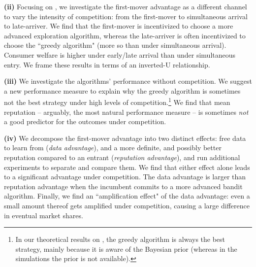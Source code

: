 
\textbf{(ii)} Focusing on \HardMax, we investigate the first-mover advantage as a different channel to vary the intensity of competition: from the first-mover to simultaneous arrival to late-arriver. We find that the first-mover is incentivized to choose a more advanced exploration algorithm, whereas the late-arriver is often incentivized to choose the ``greedy algorithm" (more so than under simultaneous arrival). Consumer welfare is higher under early/late arrival than under simultaneous entry. We frame these results in terms of an inverted-U relationship.



\textbf{(iii)} We investigate the algorithms' performance without competition. We suggest a new performance measure to explain why the greedy algorithm is sometimes not the best strategy under high levels of competition.\footnote{In our theoretical results on \HardMax, the greedy algorithm is always the best strategy, mainly because it is aware of the Bayesian prior (whereas in the simulations  the prior is not available).}
     We find that mean reputation -- arguably, the most natural performance measure -- is sometimes \emph{not} a good predictor for the outcomes under competition.

\textbf{(iv)} We decompose the first-mover advantage into two distinct effects: free data to learn from (\emph{data advantage}), and a more definite, and possibly better reputation compared to an entrant (\emph{reputation advantage}), and run additional experiments to separate and compare them. We find that either effect alone leads to a significant advantage under competition. The data advantage is larger than reputation advantage when the incumbent commits to a more advanced bandit algorithm. Finally, we find an ``amplification effect" of the data advantage: even a small amount thereof gets amplified under competition, causing a large difference in eventual market shares.

